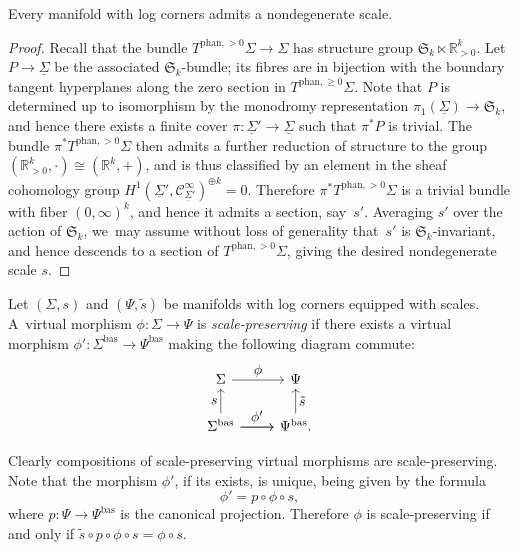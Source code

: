 \documentclass[JEP,XML,SOM,Unicode,NoFloatCountersInSection,published]{cedram}
\let\tst\textstyle
\theoremstyle{definition}
\theoremstyle{remark}
\let\defn\emph
\newcommand{\RR}{\mathbb{R}}
\renewcommand{\ge}{\geqslant}
\newcommand{\Cinf}[1]{\mathscr{C}^{\infty}_{#1}}
\newcommand{\Sig}{\Sigma}
\newcommand{\uSig}{\underline{\Sigma}}
\newcommand{\bas}[1]{{#1}^{\mathrm{bas}}}
\newcommand{\phant}{\mathrm{phan}}
\newcommand{\Sigbas}{\bas{\Sig}}
\newcommand{\Psibas}{\bas{\Psi}}
\newcommand{\tbposphan}[2][]{T^{\phant,>0}_{#1}#2}
\newcommand{\tbgephan}[2][]{T^{\phant,\ge0}_{#1}#2}
\newcommand{\symgp}[1]{\mathfrak{S}_{#1}}
\begin{document}
\begin{proposition}\label{prop:scales-exist}
Every manifold with log corners admits a nondegenerate scale.
\end{proposition}

\begin{proof}
Recall that the bundle $\tbposphan{\Sig} \to \Sig$ has structure group $\symgp{k}\ltimes \RR_{>0}^k$.
Let $P \to \uSig$ be the associated $\symgp{k}$-bundle; its fibres are in bijection with the boundary tangent hyperplanes along the zero section in $\tbgephan{\Sig}$. Note that $P$ is determined up to isomorphism by the monodromy representation $\pi_1(\uSig) \to \symgp{k}$, and hence there exists a finite cover $\pi \colon \uSig' \to \uSig$ such that $\pi^*P$ is trivial. The bundle $\pi^*\tbposphan{\Sig}$ then admits a further reduction of structure to the group $(\RR_{>0}^k,\cdot)\cong (\RR^k,+)$, and is thus classified by an element in the sheaf cohomology group $H^1(\uSig',\Cinf{\uSig'})^{\oplus k} = 0$. Therefore $\pi^*\tbposphan{\Sig}$ is a trivial bundle with fiber $(0,\infty)^k$, and hence it admits a section, say~$s'$. Averaging $s'$ over the action of $\symgp{k}$, we~may assume without loss of generality that~$s'$ is $\symgp{k}$-invariant, and hence descends to a section of $\tbposphan{\Sig}$, giving the desired nondegenerate scale $s$.
\end{proof}

\begin{definition}\label{def:scale-preserving}
Let $(\Sig,s)$ and $(\Psi,\tilde s)$ be manifolds with log corners equipped with scales. A~virtual morphism $\phi \colon \Sig \to \Psi$ is \defn{scale-preserving} if there exists a virtual morphism $\phi' \colon \Sigbas \to \Psibas$ making the following diagram commute:
\begin{equation}\label{eq:scale-preserving}
\begin{tikzcd}
\Sig \ar[r,"\tst \phi"] & \Psi \\
\Sigbas \ar[r,"\tst \phi'"]\ar[u,"\tst  s"] \ar[r] & \Psibas\ar[u,"\tst \tilde s"'].
\end{tikzcd}
\end{equation}
\end{definition}
Clearly compositions of scale-preserving virtual morphisms are scale-preserving. Note that the morphism $\phi'$, if its exists, is unique, being given by the formula
\begin{equation}\label{eq:scale-preserving-concrete}
\phi' = p \circ \phi \circ s,
\end{equation}
where $p \colon \Psi \to \Psibas$ is the canonical projection. Therefore $\phi$ is scale-preserving if and only if $\tilde{s}\circ p\circ\phi\circ s=\phi\circ s$.
\end{document}
